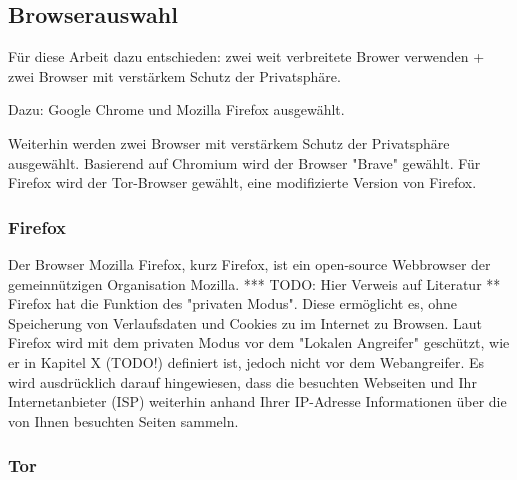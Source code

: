 \subsection{Browserauswahl}

Für diese Arbeit dazu entschieden: zwei weit verbreitete Brower verwenden + zwei Browser mit verstärkem Schutz der Privatsphäre.

Dazu: Google Chrome und Mozilla Firefox ausgewählt.

Weiterhin werden zwei Browser mit verstärkem Schutz der Privatsphäre ausgewählt.
Basierend auf Chromium wird der Browser "Brave" gewählt.
Für Firefox wird der Tor-Browser gewählt, eine modifizierte Version von Firefox.

\subsubsection*{Firefox}

Der Browser Mozilla Firefox, kurz Firefox, ist ein open-source Webbrowser der gemeinnützigen Organisation Mozilla. 
*** TODO: Hier Verweis auf Literatur **
Firefox hat die Funktion des "privaten Modus". Diese ermöglicht es, ohne Speicherung von Verlaufsdaten und Cookies zu im Internet zu Browsen.
Laut Firefox wird mit dem privaten Modus vor dem "Lokalen Angreifer" geschützt, wie er in Kapitel X (TODO!) definiert ist, jedoch nicht vor dem Webangreifer.
Es wird ausdrücklich darauf hingewiesen, dass die besuchten Webseiten und Ihr Internetanbieter (ISP)  weiterhin anhand Ihrer IP-Adresse Informationen über die von Ihnen besuchten Seiten sammeln.


\subsubsection*{Tor}

